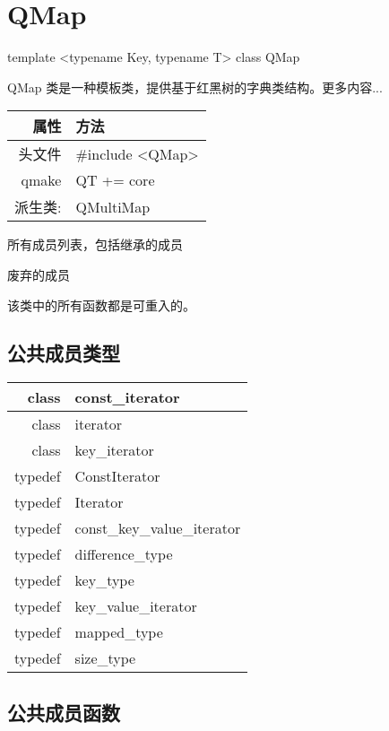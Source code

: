 \chapter{QMap}

template <typename Key, typename T> class QMap

QMap 类是一种模板类，提供基于红黑树的字典类结构。更多内容...


\begin{tabular}{|r|l|}
	\hline
	属性 & 方法 \\
	\hline
	头文件 & \#include <QMap>\\      
	\hline
	qmake & QT += core\\      
	\hline
	派生类:	& QMultiMap \\
	\hline
\end{tabular}

\begin{compactitem}
\item 所有成员列表，包括继承的成员
\item 废弃的成员
\end{compactitem}

\begin{notice}
该类中的所有函数都是可重入的。
\end{notice}

\section{公共成员类型}

\begin{longtable}[l]{|r|l|}
\hline
class	& const\_iterator \\
\hline
class &	iterator \\ 
\hline
class &	key\_iterator \\ 
\hline
typedef	&ConstIterator \\ 
\hline
typedef	&Iterator \\ 
\hline
typedef	&const\_key\_value\_iterator \\
\hline
typedef	&difference\_type \\        
\hline
typedef	&key\_type \\
\hline
typedef & key\_value\_iterator \\
\hline
typedef	&mapped\_type \\ 
\hline
typedef	&size\_type \\ 
\hline
\end{longtable}

\section{公共成员函数}

